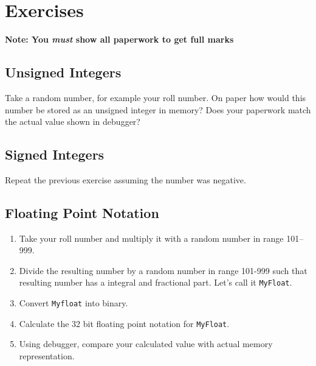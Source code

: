\documentclass[12pt,a4paper]{article}
\begin{document}
\section{Exercises}
\textbf{Note: You \emph{must} show all paperwork to get full marks}
\subsection{Unsigned Integers}
Take a random number, for example your roll number. On paper how would this number be stored as an unsigned integer in memory? Does your paperwork match the actual value shown in debugger?
\subsection{Signed Integers}
Repeat the previous exercise assuming the number was negative.
\subsection{Floating Point Notation}
\begin{enumerate}
\item Take your roll number and multiply it with a random number in range 101--999.
\item Divide the resulting number by a random number in range 101-999 such that resulting number has a integral and fractional part. Let's call it \verb|MyFloat|.
\item Convert \verb|Myfloat| into binary.
\item Calculate the 32 bit floating point notation for \verb|MyFloat|.
\item Using debugger, compare your calculated value with actual memory representation.
\end{enumerate}
\end{document}
